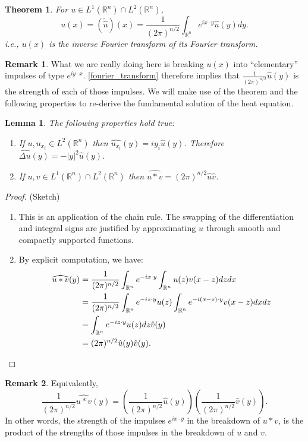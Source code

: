 \documentclass[openany, amssymb, psamsfonts]{amsart}
\newtheorem{thm}{Theorem}[section]
\newtheorem{lem}{Lemma}[section]
\theoremstyle{definition}
\newtheorem{rem}{Remark}[section]
\numberwithin{equation}{section}
\newcommand{\bbr}{\mathbb{R}}
\begin{document}
\begin{thm} \label{fourier_transform}
    For $u \in L^1(\bbr^n) \cap L^2(\bbr^n)$, 
    \begin{equation}
        u (x) = (\check{\hat{u}}) (x) = \frac{1}{(2 \pi)^{n/2}} \int_{\bbr^n}e^{i x \cdot y} \hat{u}(y) dy.
    \end{equation}
    i.e., $u(x)$ is the inverse Fourier transform of its Fourier transform.
\end{thm}
\begin{rem} What we are really doing here is breaking $u(x)$ into ``elementary'' impulses of type $e^{i y\cdot x}$. \autoref{fourier_transform} therefore implies that $\frac{1}{(2\pi)^{n/2}} \hat{u}(y)$ is the strength of each of those impulses. We will make use of the theorem and the following properties to re-derive the fundamental solution of the heat equation.
\end{rem}
\begin{lem} \label{fourier_properties}
    The following properties hold true:
\begin{enumerate}
    \item If $u, u_{x_i} \in L^2(\bbr^n)$ then $\widehat{u_{x_i}}(y) = i y_i \hat{u}(y)$. Therefore $\widehat{\Delta u}(y) = - |y|^2\hat{u}(y)$.
    \item If $u, v \in L^1(\bbr^n) \cap L^2(\bbr^n)$ then $\widehat{u * v} = (2 \pi)^{n/2} \hat{u} \hat{v}$.
\end{enumerate}
\end{lem}

\begin{proof} (Sketch)
    \begin{enumerate}
        \item This is an application of the chain rule. The swapping of the differentiation and integral signs  are justified by approximating $u$ through smooth and compactly supported functions.
        \item By explicit computation, we have:
        \begin{align*}
            \widehat{u * v} (y) &= \frac{1}{(2\pi)^{n/2}} \int_{\bbr^n} e^{-i x \cdot y} \int_{\bbr^n} u(z) v(x-z) dz dx \\
            &= \frac{1}{(2\pi)^{n/2}} \int_{\bbr^n} e^{-i z \cdot y} u(z) \int_{\bbr^n} e^{-i (x-z) \cdot y} v(x-z) dx dz \\
            &= \int_{\bbr^n} e^{-i z \cdot y} u(z) dz \hat{v}(y)\\
            &= (2 \pi)^{n/2} \hat{u}(y) \hat{v}(y) .\qedhere
        \end{align*}
    \end{enumerate}
\end{proof}
\begin{rem}
    Equivalently, \[
        \frac{1}{(2\pi)^{n/2}} \widehat{u * v} (y) =  \left( \frac{1}{(2\pi)^{n/2}} \hat{u} (y)\right) \left(\frac{1}{(2\pi)^{n/2}} \hat{v} (y)\right).\]
    In other words, the strength of the impulses $e^{i x \cdot y}$ in the breakdown of $u * v$, is the product of the strengths of those impulses in the breakdown of $u$ and $v$.
\end{rem}
\end{document}
